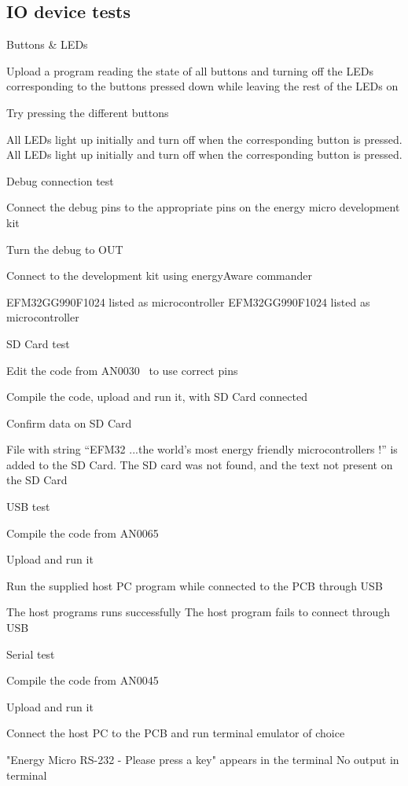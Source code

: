 \subsection{IO device tests}
\test
{Buttons \& LEDs}{
    \item{Upload a program reading the state of all buttons and turning off the LEDs corresponding to the buttons pressed down while leaving the rest of the LEDs on}
    \item{Try pressing the different buttons}
}{All LEDs light up initially and turn off when the corresponding button is pressed.}
{All LEDs light up initially and turn off when the corresponding button is pressed.}

\test
{Debug connection test}{
    \item{Connect the debug pins to the appropriate pins on the energy micro development kit}
    \item{Turn the debug to OUT}
    \item{Connect to the development kit using energyAware commander}
}{EFM32GG990F1024 listed as microcontroller}
{EFM32GG990F1024 listed as microcontroller}

\test
{SD Card test}{
    \item{Edit the code from AN0030~\cite{an0030} to use correct pins}
    \item{Compile the code, upload and run it, with SD Card connected}
    \item{Confirm data on SD Card}
}{File with string ``EFM32 ...the world's most energy friendly microcontrollers !'' is added to the SD Card.}
{The SD card was not found, and the text not present on the SD Card}

\test
{USB test}{
    \item{Compile the code from AN0065~\cite{an0065}}
    \item{Upload and run it}
    \item{Run the supplied host PC program while connected to the PCB through USB}
}{The host programs runs successfully}
{The host program fails to connect through USB}

\test
{Serial test}{
    \item{Compile the code from AN0045~\cite{an0045}}
    \item{Upload and run it}
    \item{Connect the host PC to the PCB and run terminal emulator of choice}
}{"Energy Micro RS-232 - Please press a key" appears in the terminal}
{No output in terminal}

